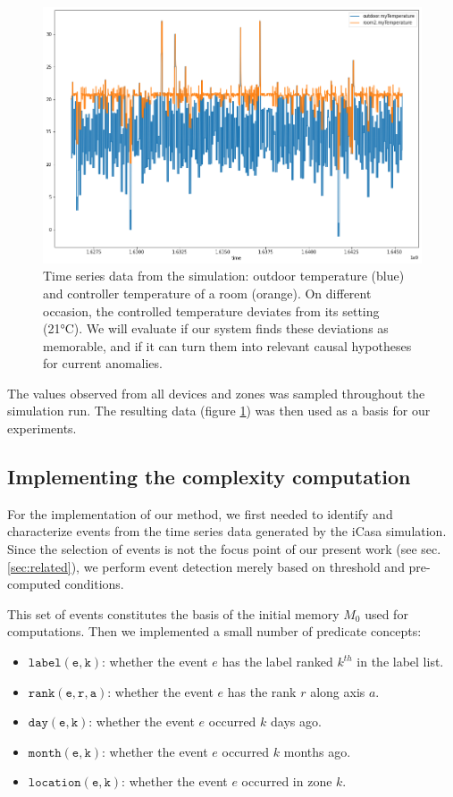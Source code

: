 \documentclass[entropy,article,submit,moreauthors,pdftex]{Definitions/mdpi}
\begin{document}
\begin{figure}[ht]
    \includegraphics[width=\linewidth]{figures/ts_example}
    \caption{Time series data from the simulation: outdoor temperature (blue) and
        controller temperature of a room (orange). On different occasion, the
        controlled temperature deviates from its setting (21°C). We will evaluate if
        our system finds these deviations as memorable, and if it can turn them into relevant causal
        hypotheses for current anomalies.}
    \label{fig:ts_example}
\end{figure}

The values observed from all devices and zones was sampled throughout
the simulation run. The resulting data (figure
\ref{fig:ts_example}) was then used as a basis for our experiments.


\subsection{Implementing the complexity computation}

For the implementation of our method, we first needed to identify and
characterize events from the time series data generated by the iCasa simulation.
Since the selection of events is not the focus point of our present work (see sec.
\ref{sec:related}), we perform event detection merely based on threshold and pre-computed conditions.

This set of events constitutes the basis of the initial memory $M_0$ used
for computations.
Then we implemented a small number of predicate concepts:
\begin{itemize}
    \item $\mathtt{label(e, k)}$: whether the event $e$ has the label ranked
          $k^{th}$ in the label list.
    \item $\mathtt{rank(e, r, a)}$: whether the event $e$ has the rank $r$
          along axis $a$.
    \item $\mathtt{day(e, k)}$: whether the event $e$ occurred $k$ days ago.
    \item $\mathtt{month(e, k)}$: whether the event $e$ occurred $k$ months
          ago.
    \item $\mathtt{location(e, k)}$: whether the event $e$ occurred in zone
          $k$.
\end{itemize}
\end{document}
